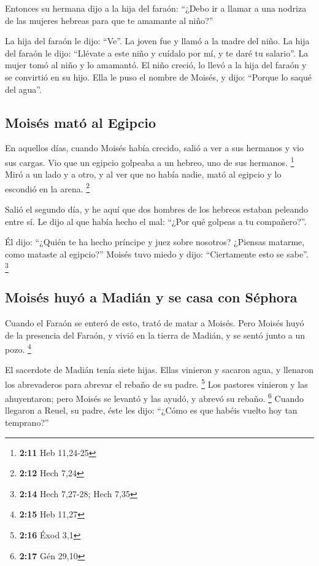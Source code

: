  Entonces su hermana dijo a la hija del faraón: ``¿Debo ir
a llamar a una nodriza de las mujeres hebreas para que te amamante al
niño?''

 La hija del faraón le dijo: ``Ve''. La joven fue y llamó
a la madre del niño.  La hija del faraón le dijo:
``Llévate a este niño y cuídalo por mí, y te daré tu salario''. La mujer
tomó al niño y lo amamantó.  El niño creció, lo llevó a
la hija del faraón y se convirtió en su hijo. Ella le puso el nombre de
Moisés, y dijo: ``Porque lo saqué del agua''.

\hypertarget{moisuxe9s-matuxf3-al-egipcio}{%
\subsection{Moisés mató al Egipcio}\label{moisuxe9s-matuxf3-al-egipcio}}

 En aquellos días, cuando Moisés había crecido, salió a
ver a sus hermanos y vio sus cargas. Vio que un egipcio golpeaba a un
hebreo, uno de sus hermanos. \footnote{\textbf{2:11} Heb 11,24-25}
 Miró a un lado y a otro, y al ver que no había nadie,
mató al egipcio y lo escondió en la arena. \footnote{\textbf{2:12} Hech
  7,24}

 Salió el segundo día, y he aquí que dos hombres de los
hebreos estaban peleando entre sí. Le dijo al que había hecho el mal:
``¿Por qué golpeas a tu compañero?''.

 Él dijo: ``¿Quién te ha hecho príncipe y juez sobre
nosotros? ¿Piensas matarme, como mataste al egipcio?'' Moisés tuvo miedo
y dijo: ``Ciertamente esto se sabe''. \footnote{\textbf{2:14} Hech
  7,27-28; Hech 7,35}

\hypertarget{moisuxe9s-huyuxf3-a-madiuxe1n-y-se-casa-con-suxe9phora}{%
\subsection{Moisés huyó a Madián y se casa con
Séphora}\label{moisuxe9s-huyuxf3-a-madiuxe1n-y-se-casa-con-suxe9phora}}

 Cuando el Faraón se enteró de esto, trató de matar a
Moisés. Pero Moisés huyó de la presencia del Faraón, y vivió en la
tierra de Madián, y se sentó junto a un pozo. \footnote{\textbf{2:15}
  Heb 11,27}

 El sacerdote de Madián tenía siete hijas. Ellas vinieron
y sacaron agua, y llenaron los abrevaderos para abrevar el rebaño de su
padre. \footnote{\textbf{2:16} Éxod 3,1}  Los pastores
vinieron y las ahuyentaron; pero Moisés se levantó y las ayudó, y abrevó
su rebaño. \footnote{\textbf{2:17} Gén 29,10}  Cuando
llegaron a Reuel, su padre, éste les dijo: ``¿Cómo es que habéis vuelto
hoy tan temprano?''

